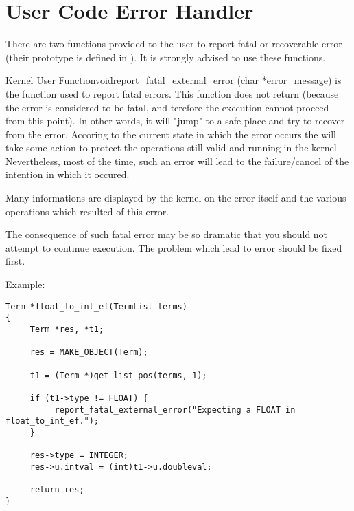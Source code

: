 \section{User Code Error Handler}

There are two functions provided to the user to report fatal or recoverable
error (their prototype is defined in ). It is strongly
advised to use these functions.

\begin{typefn}{Kernel User Function}{void}{report\_fatal\_external\_error} {(char *error\_message)}
is the function used to report fatal errors. This function does not return
(because the error is considered to be fatal, and terefore the execution cannot
proceed from this point). In other words, it will "jump" to a safe place and
try to recover from the error.  Accoring to the current state in which the
error occurs the \CPK{} will take some action to protect the operations still
valid and running in the kernel. Nevertheless, most of the time, such an error
will lead to the failure/cancel of the intention in which it occured.

Many informations are displayed by the kernel on the error itself and the
various operations which resulted of this error. 

The consequence of such fatal error may be so dramatic that you should
not attempt to continue execution. The problem which lead to error should be
fixed first.

Example:
\begin{verbatim}
Term *float_to_int_ef(TermList terms)
{
     Term *res, *t1;

     res = MAKE_OBJECT(Term);

     t1 = (Term *)get_list_pos(terms, 1);

     if (t1->type != FLOAT) {
          report_fatal_external_error("Expecting a FLOAT in float_to_int_ef.");
     }

     res->type = INTEGER;
     res->u.intval = (int)t1->u.doubleval;

     return res;
}
\end{verbatim}
\end{typefn}

